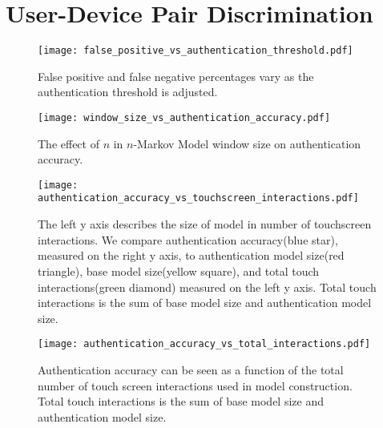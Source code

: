 \section{User-Device Pair Discrimination}
\label{sec:differentiation}

\begin{figure}
\centering
\texttt{[image: false\_positive\_vs\_authentication\_threshold.pdf]}
\caption{False positive and false negative percentages vary as the authentication threshold is adjusted.}
\label{fig:threshold_vs_percentages}
\end{figure}

\begin{figure}
\centering
\texttt{[image: window\_size\_vs\_authentication\_accuracy.pdf]}
\caption{The effect of $n$ in $n$-Markov Model window size on authentication accuracy.}
\label{fig:window_size_vs_authentication_accuracy}
\end{figure}

\begin{figure}
\centering
\texttt{[image: authentication\_accuracy\_vs\_touchscreen\_interactions.pdf]}
\caption{
The left y axis describes the size of model
in number of touchscreen interactions.
We compare
authentication accuracy(blue star), measured on the right y axis, 
to authentication model size(red triangle),
base model size(yellow square),
and total touch interactions(green diamond)
measured on the left y axis.
Total touch interactions is the sum of
base model size and authentication model size.
}
\label{fig:authentication_accuracy}
\end{figure}

\begin{figure}
\centering
\texttt{[image: authentication\_accuracy\_vs\_total\_interactions.pdf]}
\caption{
Authentication accuracy can be seen as
a function of
the total number of touch screen interactions
used in model construction.
Total touch interactions is the sum of
base model size and authentication model size.
}
\label{fig:total_touches_vs_authentication_accuracy}
\end{figure}

